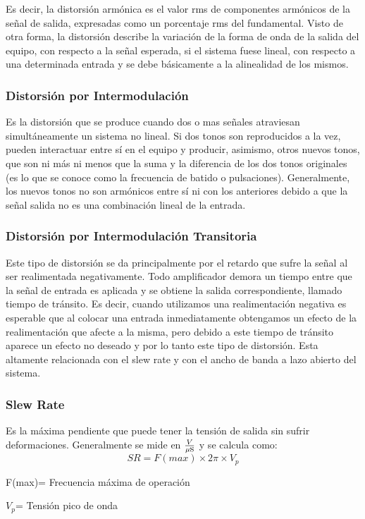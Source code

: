Es decir, la distorsión armónica es el valor rms de componentes armónicos de la señal de salida, expresadas como un porcentaje rms del fundamental.
Visto de otra forma, la distorsión describe la variación de la forma de onda de la salida del equipo, con respecto a la señal esperada, si el sistema fuese lineal, con respecto a una determinada entrada y se debe básicamente a la alinealidad de los mismos.
\medskip 
\subsubsection*{Distorsión por Intermodulación}


Es la distorsión que se produce cuando dos o mas señales atraviesan simultáneamente un sistema no lineal. Si dos tonos son reproducidos a la vez, pueden interactuar entre sí en el equipo y producir, asimismo, otros nuevos tonos, que son ni más ni menos que la suma y la diferencia de los dos tonos originales (es lo que se conoce como la frecuencia de batido o pulsaciones). Generalmente, los nuevos tonos no son armónicos entre sí ni con los anteriores debido a que la señal salida no es una combinación lineal de la entrada.
\medskip 
\subsubsection*{Distorsión por Intermodulación Transitoria}


Este tipo de distorsión se da principalmente por el retardo que sufre la señal al ser realimentada negativamente. Todo amplificador demora un tiempo entre que la señal de entrada es aplicada y se obtiene la salida correspondiente, llamado tiempo de tránsito. Es decir, cuando utilizamos una realimentación negativa es esperable que al colocar una entrada inmediatamente obtengamos un efecto de la realimentación que afecte a la misma, pero debido a este tiempo de tránsito aparece un efecto no deseado y por lo tanto este tipo de distorsión. Esta altamente relacionada con el slew rate y con el ancho de banda a lazo abierto del sistema. 
\medskip 
\subsubsection*{Slew Rate}
	
Es la máxima pendiente que puede tener la tensión de salida sin sufrir deformaciones. Generalmente se mide en $\frac{V}{\mu\mbox{s}}$ y se calcula como:
\begin{equation}
SR = F(max) \times 2\pi \times V_p
\end{equation}
\begin{description}
\item F(max)= Frecuencia máxima de operación
\item  $V_p$= Tensión pico de onda
\end{description}
\medskip 
